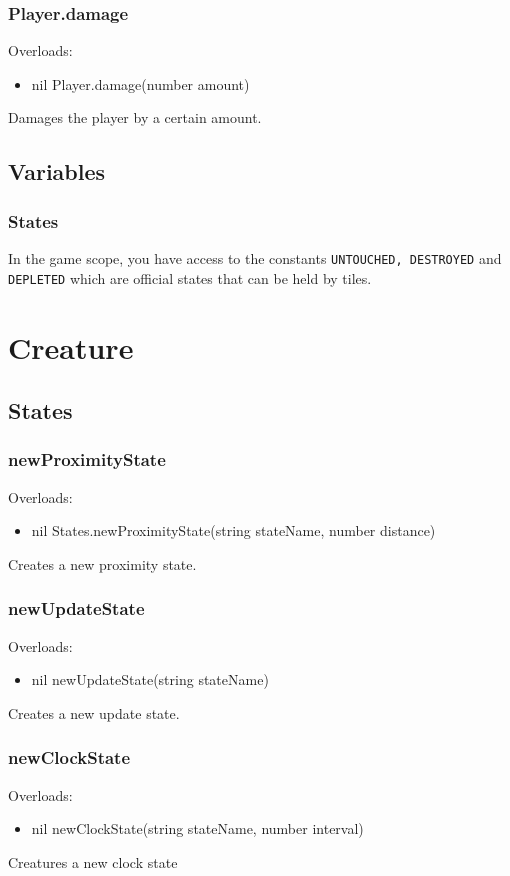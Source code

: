 \documentclass{book}
\newenvironment{ulist}
	{\begin{itemize}
			\itemsep0em}
	{\end{itemize}}
\begin{document}
\subsubsection{Player.damage}
Overloads:
\begin{ulist}
	\item nil Player.damage(number amount)
\end{ulist}
Damages the player by a certain amount.


\subsection{Variables}
\subsubsection{States}
In the game scope, you have access to the constants \texttt{UNTOUCHED, DESTROYED} and \texttt{DEPLETED} which are official states that can be held by tiles.



\section{Creature}
\subsection{States}
\subsubsection{newProximityState}
Overloads:
\begin{ulist}
	\item nil States.newProximityState(string stateName, number distance)
\end{ulist}
Creates a new proximity state.

\subsubsection{newUpdateState}
Overloads:
\begin{ulist}
	\item nil newUpdateState(string stateName)
\end{ulist}
Creates a new update state.

\subsubsection{newClockState}
Overloads:
\begin{ulist}
	\item nil newClockState(string stateName, number interval)
\end{ulist}
Creatures a new clock state
\end{document}
